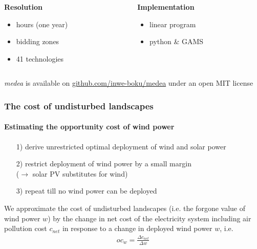 \documentclass[aspectratio=169, xcolor=dvipsnames]{beamer}
\begin{document}
\begin{frame}
\begin{footnotesize}
\begin{columns}[t]
\begin{column}{0.325\textwidth}
\textbf{Resolution}
\begin{itemize}
\item hours (one year)
\item bidding zones
\item 41 technologies
\end{itemize}
\end{column}

\begin{column}{0.325\textwidth}
\textbf{Implementation}
\begin{itemize}
\item linear program
\item python \& GAMS
\end{itemize}
\end{column}
\end{columns}
\end{footnotesize}
\medskip
\begin{center}
\emph{medea} is available on \href{https://github.com/inwe-boku/medea}{github.com/inwe-boku/medea} under an open MIT license
\end{center}
\end{frame}


\begin{frame}
\frametitle{The cost of undisturbed landscapes}
\framesubtitle{Estimating the opportunity cost of wind power}
\begin{itemize}
\item[1)] derive unrestricted optimal deployment of wind and solar power
\item[2)] restrict deployment of wind power by a small margin \\($\rightarrow$ solar PV substitutes for wind)
\item[3)] repeat till no wind power can be deployed
\end{itemize}

\bigskip
We approximate the cost of undisturbed landscapes (i.e. the forgone value of wind power $w$) by the change in net cost of the electricity system including air pollution cost $c_{net}$ in response to a change in deployed wind power $w$, i.e.
\begin{align*}
oc_w = \frac{\Delta c_{net}}{\Delta w}
\end{align*}

\end{frame}
\end{document}
